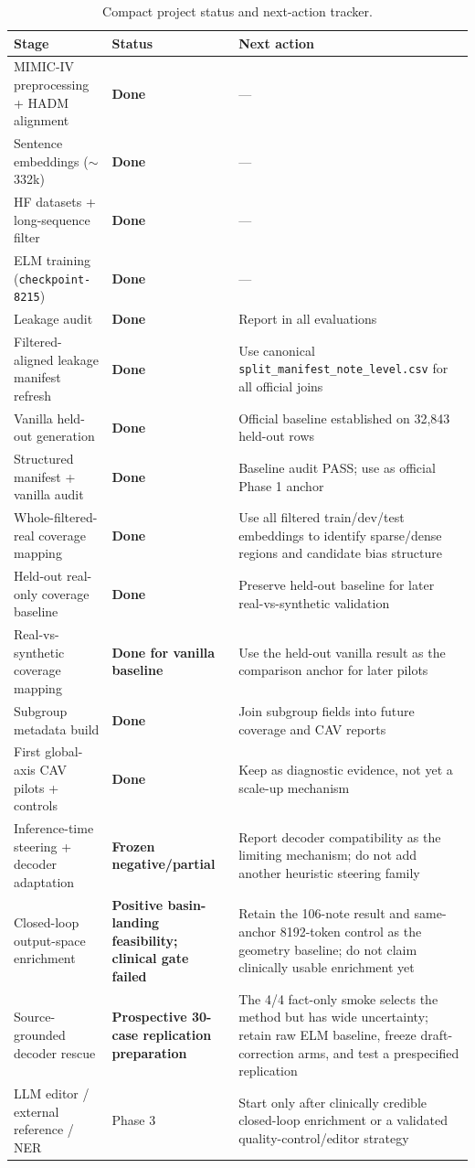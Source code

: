 \documentclass[11pt]{article}
\begin{document}
\begin{table}[h]
\centering
\small
\begin{tabularx}{\textwidth}{l l X}
\toprule
\textbf{Stage} & \textbf{Status} & \textbf{Next action} \\
\midrule
MIMIC-IV preprocessing + HADM alignment & \textbf{Done} & --- \\
Sentence embeddings ($\sim$332k) & \textbf{Done} & --- \\
HF datasets + long-sequence filter & \textbf{Done} & --- \\
ELM training (\texttt{checkpoint-8215}) & \textbf{Done} & --- \\
Leakage audit & \textbf{Done} & Report in all evaluations \\
Filtered-aligned leakage manifest refresh & \textbf{Done} & Use canonical \texttt{split\_manifest\_note\_level.csv} for all official joins \\
Vanilla held-out generation & \textbf{Done} & Official baseline established on 32,843 held-out rows \\
Structured manifest + vanilla audit & \textbf{Done} & Baseline audit PASS; use as official Phase 1 anchor \\
Whole-filtered-real coverage mapping & \textbf{Done} & Use all filtered train/dev/test embeddings to identify sparse/dense regions and candidate bias structure \\
Held-out real-only coverage baseline & \textbf{Done} & Preserve held-out baseline for later real-vs-synthetic validation \\
Real-vs-synthetic coverage mapping & \textbf{Done for vanilla baseline} & Use the held-out vanilla result as the comparison anchor for later pilots \\
Subgroup metadata build & \textbf{Done} & Join subgroup fields into future coverage and CAV reports \\
First global-axis CAV pilots + controls & \textbf{Done} & Keep as diagnostic evidence, not yet a scale-up mechanism \\
Inference-time steering + decoder adaptation & \textbf{Frozen negative/partial} & Report decoder compatibility as the limiting mechanism; do not add another heuristic steering family \\
Closed-loop output-space enrichment & \textbf{Positive basin-landing feasibility; clinical gate failed} & Retain the 106-note result and same-anchor 8192-token control as the geometry baseline; do not claim clinically usable enrichment yet \\
Source-grounded decoder rescue & \textbf{Prospective 30-case replication preparation} & The 4/4 fact-only smoke selects the method but has wide uncertainty; retain raw ELM baseline, freeze draft-correction arms, and test a prespecified replication \\
LLM editor / external reference / NER & Phase 3 & Start only after clinically credible closed-loop enrichment or a validated quality-control/editor strategy \\
\bottomrule
\end{tabularx}
\caption{Compact project status and next-action tracker.}
\end{table}
\end{document}
